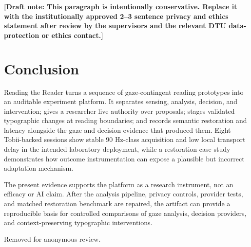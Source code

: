 \documentclass[sigconf,review,anonymous]{acmart}
\newcommand{\draftnote}[1]{\textcolor{draftred}{\textbf{[Draft note: #1]}}}
\begin{document}
\draftnote{This paragraph is intentionally conservative. Replace it with the institutionally approved 2--3 sentence privacy and ethics statement after review by the supervisors and the relevant DTU data-protection or ethics contact.}

\section{Conclusion}

Reading the Reader turns a sequence of gaze-contingent reading prototypes into an auditable experiment platform.
It separates sensing, analysis, decision, and intervention; gives a researcher live authority over proposals; stages validated typographic changes at reading boundaries; and records semantic restoration and latency alongside the gaze and decision evidence that produced them.
Eight Tobii-backed sessions show stable 90 Hz-class acquisition and low local transport delay in the intended laboratory deployment, while a restoration case study demonstrates how outcome instrumentation can expose a plausible but incorrect adaptation mechanism.

The present evidence supports the platform as a research instrument, not an efficacy or AI claim.
After the analysis pipeline, privacy controls, provider tests, and matched restoration benchmark are repaired, the artifact can provide a reproducible basis for controlled comparisons of gaze analysis, decision providers, and context-preserving typographic interventions.

\begin{acks}
Removed for anonymous review.
\end{acks}

\balance


\end{document}
